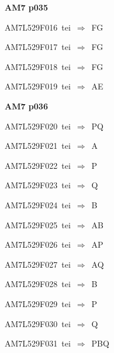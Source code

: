 \par\vfill\eject
{\bf\hfill AM7 p035\hfill\hbox{}}\par\bigskip
{\sixrm AM7L529F016\ {\sixit tei}\ }$\Rightarrow$\ FG\par\smallskip
{\sixrm AM7L529F017\ {\sixit tei}\ }$\Rightarrow$\ FG\par\smallskip
{\sixrm AM7L529F018\ {\sixit tei}\ }$\Rightarrow$\ FG\par\smallskip
{\sixrm AM7L529F019\ {\sixit tei}\ }$\Rightarrow$\ AE\par\smallskip

\par\vfill\eject
{\bf\hfill AM7 p036\hfill\hbox{}}\par\bigskip
{\sixrm AM7L529F020\ {\sixit tei}\ }$\Rightarrow$\ PQ\par\smallskip
{\sixrm AM7L529F021\ {\sixit tei}\ }$\Rightarrow$\ A\par\smallskip
{\sixrm AM7L529F022\ {\sixit tei}\ }$\Rightarrow$\ P\par\smallskip
{\sixrm AM7L529F023\ {\sixit tei}\ }$\Rightarrow$\ Q\par\smallskip
{\sixrm AM7L529F024\ {\sixit tei}\ }$\Rightarrow$\ B\par\smallskip
{\sixrm AM7L529F025\ {\sixit tei}\ }$\Rightarrow$\ AB\par\smallskip
{\sixrm AM7L529F026\ {\sixit tei}\ }$\Rightarrow$\ AP\par\smallskip
{\sixrm AM7L529F027\ {\sixit tei}\ }$\Rightarrow$\ AQ\par\smallskip
{\sixrm AM7L529F028\ {\sixit tei}\ }$\Rightarrow$\ B\par\smallskip
{\sixrm AM7L529F029\ {\sixit tei}\ }$\Rightarrow$\ P\par\smallskip
{\sixrm AM7L529F030\ {\sixit tei}\ }$\Rightarrow$\ Q\par\smallskip
{\sixrm AM7L529F031\ {\sixit tei}\ }$\Rightarrow$\ PBQ\par\smallskip

